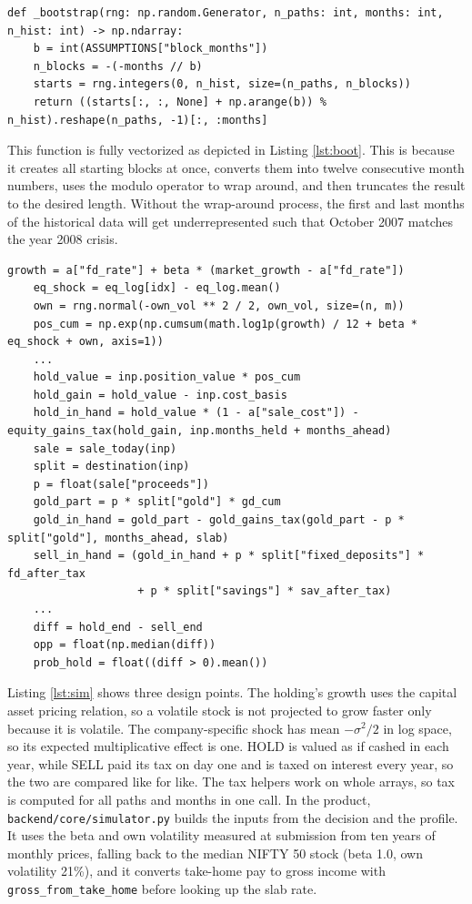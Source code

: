 \begin{lstlisting}[caption={Circular 12-month block bootstrap (\texttt{src/simulator\_v2.py})}, label=lst:boot]
def _bootstrap(rng: np.random.Generator, n_paths: int, months: int, n_hist: int) -> np.ndarray:
    b = int(ASSUMPTIONS["block_months"])
    n_blocks = -(-months // b)
    starts = rng.integers(0, n_hist, size=(n_paths, n_blocks))
    return ((starts[:, :, None] + np.arange(b)) % n_hist).reshape(n_paths, -1)[:, :months]
\end{lstlisting}

This function is fully vectorized as depicted in Listing \ref{lst:boot}. This is because it creates all starting blocks at once, converts them into twelve consecutive month numbers, uses the modulo operator to wrap around, and then truncates the result to the desired length. Without the wrap-around process, the first and last months of the historical data will get underrepresented such that October 2007 matches the year 2008 crisis.

\begin{lstlisting}[caption={Paired HOLD and SELL valuation after tax (excerpt of \texttt{simulate})}, label=lst:sim]
    growth = a["fd_rate"] + beta * (market_growth - a["fd_rate"])
    eq_shock = eq_log[idx] - eq_log.mean()
    own = rng.normal(-own_vol ** 2 / 2, own_vol, size=(n, m))
    pos_cum = np.exp(np.cumsum(math.log1p(growth) / 12 + beta * eq_shock + own, axis=1))
    ...
    hold_value = inp.position_value * pos_cum
    hold_gain = hold_value - inp.cost_basis
    hold_in_hand = hold_value * (1 - a["sale_cost"]) - equity_gains_tax(hold_gain, inp.months_held + months_ahead)
    sale = sale_today(inp)
    split = destination(inp)
    p = float(sale["proceeds"])
    gold_part = p * split["gold"] * gd_cum
    gold_in_hand = gold_part - gold_gains_tax(gold_part - p * split["gold"], months_ahead, slab)
    sell_in_hand = (gold_in_hand + p * split["fixed_deposits"] * fd_after_tax
                    + p * split["savings"] * sav_after_tax)
    ...
    diff = hold_end - sell_end
    opp = float(np.median(diff))
    prob_hold = float((diff > 0).mean())
\end{lstlisting}

Listing \ref{lst:sim} shows three design points. The holding's growth uses the capital asset pricing relation, so a volatile stock is not projected to grow faster only because it is volatile. The company-specific shock has mean $-\sigma^2/2$ in log space, so its expected multiplicative effect is one. HOLD is valued as if cashed in each year, while SELL paid its tax on day one and is taxed on interest every year, so the two are compared like for like. The tax helpers work on whole arrays, so tax is computed for all paths and months in one call. In the product, \texttt{backend/core/simulator.py} builds the inputs from the decision and the profile. It uses the beta and own volatility measured at submission from ten years of monthly prices, falling back to the median NIFTY 50 stock (beta 1.0, own volatility 21\%), and it converts take-home pay to gross income with \texttt{gross\_from\_take\_home} before looking up the slab rate.

